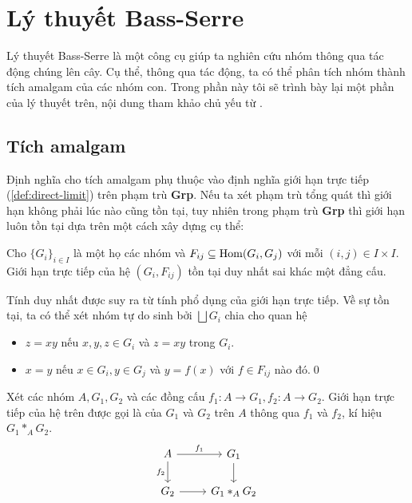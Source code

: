 
\section{Lý thuyết Bass-Serre}
Lý thuyết Bass-Serre là một công cụ giúp ta nghiên cứu nhóm thông qua tác động chúng lên cây. Cụ thể, thông qua tác động, ta có thể phân tích nhóm thành tích amalgam của các nhóm con. Trong phần này tôi sẽ trình bày lại một phần của lý thuyết trên, nội dung tham khảo chủ yếu từ \cite{TreeSerre}.

\subsection{Tích amalgam}
Định nghĩa cho tích amalgam phụ thuộc vào định nghĩa giới hạn trực tiếp (\ref{def:direct-limit}) trên phạm trù \textbf{Grp}. Nếu ta xét phạm trù tổng quát thì giới hạn không phải lúc nào cũng tồn tại, tuy nhiên trong phạm trù \textbf{Grp} thì giới hạn luôn tồn tại dựa trên một cách xây dựng cụ thể:

\begin{proposition}\label{prop:unique_direct_limit}
    Cho $\{G_i\}_{i \in I}$ là một họ các nhóm và $F_{ij} \subseteq \operatorname{Hom}(G_i, G_j)$ với mỗi $(i,j) \in I \times I$. Giới hạn trực tiếp của hệ $(G_i,F_{ij})$ tồn tại duy nhất sai khác một đẳng cấu.
\end{proposition}

\startproof Tính duy nhất được suy ra từ tính phổ dụng của giới hạn trực tiếp. Về sự tồn tại, ta có thể xét nhóm tự do sinh bởi $\bigsqcup G_i$ chia cho quan hệ
\begin{itemize}
    \item $z=xy$ nếu $x,y,z \in G_i$ và $z=xy$ trong $G_i$.
    \item $x=y$ nếu $x \in G_i, y\in G_j$ và $y=f(x)$ với $f \in F_{ij}$ nào đó.\qed
\end{itemize}

\begin{define}
    Xét các nhóm $A,G_1,G_2$ và các đồng cấu $f_1: A \rightarrow G_1, f_2: A \rightarrow G_2$. Giới hạn trực tiếp của hệ trên được gọi là  của $G_1$ và $G_2$ trên $A$ thông qua $f_1$ và $f_2$, kí hiệu $G_1 *_A G_2$.
    $$
        \begin{tikzcd}
            A \arrow[d, "f_2"'] \arrow[r, "f_1"] & G_1 \arrow[d] \\
            G_2 \arrow[r]                        & G_1 *_A G_2
        \end{tikzcd}
    $$
\end{define}

